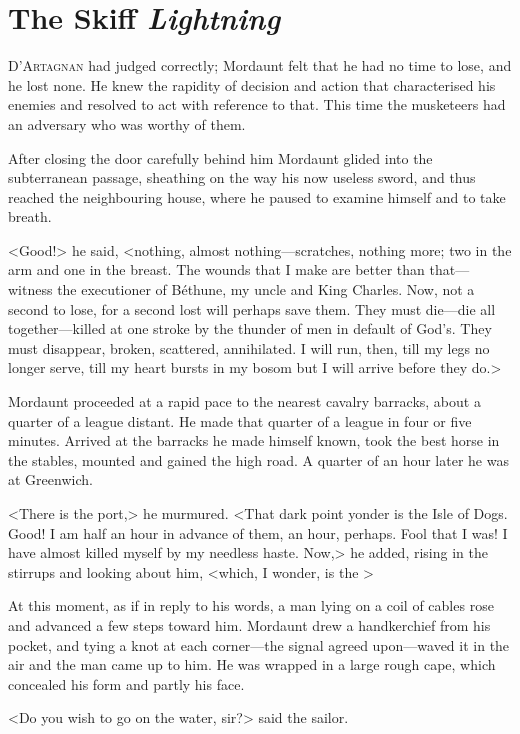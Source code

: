 \chapter{The Skiff \emph{Lightning}}
	
\lettrine{D}{'Artagnan} had judged correctly; Mordaunt felt that he had no time to lose, and he lost none. He knew the rapidity of decision and action that characterised his enemies and resolved to act with reference to that. This time the musketeers had an adversary who was worthy of them.

After closing the door carefully behind him Mordaunt glided into the subterranean passage, sheathing on the way his now useless sword, and thus reached the neighbouring house, where he paused to examine himself and to take breath.

<Good!> he said, <nothing, almost nothing—scratches, nothing more; two in the arm and one in the breast. The wounds that I make are better than that—witness the executioner of Béthune, my uncle and King Charles. Now, not a second to lose, for a second lost will perhaps save them. They must die—die all together—killed at one stroke by the thunder of men in default of God's. They must disappear, broken, scattered, annihilated. I will run, then, till my legs no longer serve, till my heart bursts in my bosom but I will arrive before they do.>

Mordaunt proceeded at a rapid pace to the nearest cavalry barracks, about a quarter of a league distant. He made that quarter of a league in four or five minutes. Arrived at the barracks he made himself known, took the best horse in the stables, mounted and gained the high road. A quarter of an hour later he was at Greenwich.

<There is the port,> he murmured. <That dark point yonder is the Isle of Dogs. Good! I am half an hour in advance of them, an hour, perhaps. Fool that I was! I have almost killed myself by my needless haste. Now,> he added, rising in the stirrups and looking about him, <which, I wonder, is the >

At this moment, as if in reply to his words, a man lying on a coil of cables rose and advanced a few steps toward him. Mordaunt drew a handkerchief from his pocket, and tying a knot at each corner—the signal agreed upon—waved it in the air and the man came up to him. He was wrapped in a large rough cape, which concealed his form and partly his face.

<Do you wish to go on the water, sir?> said the sailor.

